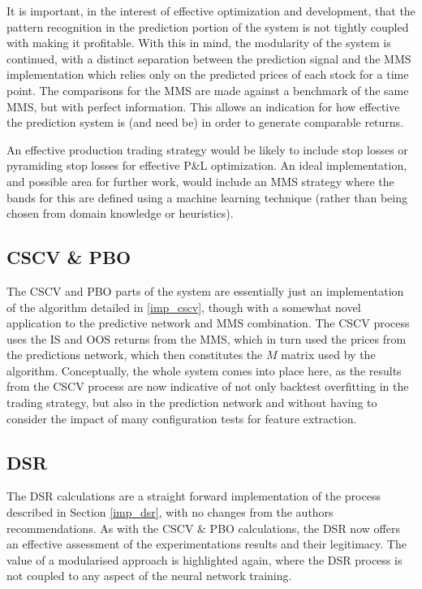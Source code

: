 \documentclass[a4paper,11pt,oneside]{article}
\theoremstyle{plain}
\theoremstyle{definition}
\begin{document}
	It is important, in the interest of effective optimization and development, that the pattern recognition in the prediction portion of the system is not tightly coupled with making it profitable. With this in mind, the modularity of the system is continued, with a distinct separation between the prediction signal and the MMS implementation which relies only on the predicted prices of each stock for a time point. The comparisons for the MMS are made against a benchmark of the same MMS, but with perfect information. This allows an indication for how effective the prediction system is (and need be) in order to generate comparable returns. \newline {}
	
	An effective production trading strategy would be likely to include stop losses or pyramiding stop losses for effective P\&L optimization. An ideal implementation, and possible area for further work, would include an MMS strategy where the bands for this are defined using a machine learning technique (rather than being chosen from domain knowledge or heuristics).\newline
	
	
	\subsection{CSCV \& PBO}\label{proc_cscv}
	
	The CSCV and PBO parts of the system are essentially just an implementation of the algorithm detailed in \ref{imp_cscv}, though with a somewhat novel application to the predictive network and MMS combination. The CSCV process uses the IS and OOS returns from the MMS, which in turn used the prices from the predictions network, which then constitutes the $M$ matrix used by the algorithm. Conceptually, the whole system comes into place here, as the results from the CSCV process are now indicative of not only backtest overfitting in the trading strategy, but also in the prediction network and without having to consider the impact of many configuration tests for feature extraction.
	
	\subsection{DSR}\label{proc_dsr}
	
	The DSR calculations are a straight forward implementation of the process described in Section \ref{imp_dsr}, with no changes from the authors recommendations. As with the CSCV \& PBO calculations, the DSR now offers an effective assessment of the experimentations results and their legitimacy. The value of a modularised approach is highlighted again, where the DSR process is not coupled to any aspect of the neural network training.
	
\end{document}
